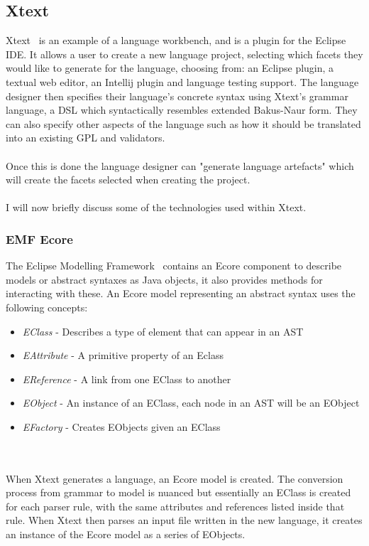 \documentclass{article}
\begin{document}
\subsection{Xtext}\label{xtext}
Xtext~\cite{xtext} is an example of a language workbench, and is a plugin for the Eclipse IDE. It allows a user to create a new language project, selecting which facets they would like to generate for the language, choosing from: an Eclipse plugin, a textual web editor, an Intellij plugin and language testing support. The language designer then specifies their language's concrete syntax using Xtext's grammar language, a DSL which syntactically resembles extended Bakus-Naur form. They can also specify other aspects of the language such as how it should be translated into an existing GPL and validators.
\\
\\
Once this is done the language designer can "generate language artefacts" which will create the facets selected when creating the project. 
\\
\\
I will now briefly discuss some of the technologies used within Xtext.
\subsubsection{EMF Ecore}\label{emf}
The Eclipse Modelling Framework~\cite{emf} contains an Ecore component to describe models or abstract syntaxes as Java objects, it also provides methods for interacting with these. An Ecore model representing an abstract syntax uses the following concepts:
\begin{itemize}
\item \emph{EClass} - Describes a type of element that can appear in an AST
\item \emph{EAttribute} - A primitive property of an Eclass
\item \emph{EReference} - A link from one EClass to another
\item \emph{EObject} - An instance of an EClass, each node in an AST will be an EObject
\item \emph{EFactory} - Creates EObjects given an EClass
\end{itemize}
\\
\\
When Xtext generates a language, an Ecore model is created. The conversion process from grammar to model is nuanced but essentially an EClass is created for each parser rule, with the same attributes and references listed inside that rule. When Xtext then parses an input file written in the new language, it creates an instance of the Ecore model as a series of EObjects.
\end{document}
